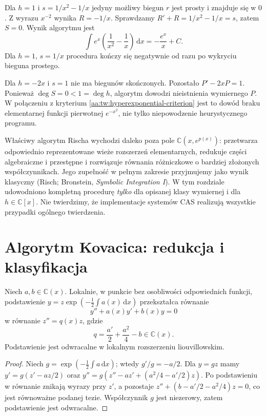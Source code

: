 \begin{przyklad}
\label{aa:prz:risch-e-success}
Dla $h=1$ i $s=1/x^2-1/x$
jedyny możliwy biegun $r$
jest prosty i znajduje się
w $0$. Z wyrazu $x^{-2}$
wynika $R=-1/x$.
Sprawdzamy
$R'+R=1/x^2-1/x=s$,
zatem $S=0$.
Wynik algorytmu jest
\[
 \int e^x\left(\frac1{x^2}-\frac1x\right)
 \,\mathrm dx=-\frac{e^x}{x}+C.
\]
Dla $h=1$, $s=1/x$
procedura kończy się negatywnie
od razu po wykryciu bieguna prostego.
\end{przyklad}

\begin{przyklad}
\label{aa:prz:risch-gauss-decision}
Dla $h=-2x$ i $s=1$
nie ma biegunów skończonych.
Pozostało $P'-2xP=1$.
Ponieważ $\deg S=0<1=\deg h$,
algorytm dowodzi nieistnienia
wymiernego $P$.
W połączeniu z kryterium
\ref{aa:tw:hyperexponential-criterion}
jest to dowód braku
elementarnej funkcji pierwotnej
$e^{-x^2}$, nie tylko niepowodzenie
heurystycznego programu.
\end{przyklad}

\begin{uwaga}
\label{aa:uw:full-risch-scope}
Właściwy algorytm Rischa
wychodzi daleko poza pole
$\mathbb C(x,e^{p(x)})$:
przetwarza odpowiednio
reprezentowane wieże
rozszerzeń elementarnych,
redukuje części algebraiczne
i przestępne i rozwiązuje
równania różniczkowe o bardziej
złożonych współczynnikach.
Jego zupełność w pełnym
zakresie przyjmujemy jako
wynik klasyczny (Risch;
Bronstein, \emph{Symbolic Integration I}).
W tym rozdziale udowodniono
kompletną procedurę \emph{tylko}
dla opisanej klasy wymiernej
i dla $h\in\mathbb C[x]$.
Nie twierdzimy, że
implementacje systemów CAS
realizują wszystkie przypadki
ogólnego twierdzenia.
\end{uwaga}

\section{Algorytm Kovacica: redukcja i klasyfikacja}

\begin{lemat}
\label{aa:lem:kovacic-normal-form}
Niech $a,b\in\mathbb C(x)$.
Lokalnie, w punkcie bez osobliwości
odpowiednich funkcji, podstawienie
$y=z\exp(-\tfrac12\int a(x)\,\mathrm dx)$
przekształca równanie
\[
 y''+a(x)y'+b(x)y=0
\]
w równanie $z''=q(x)z$, gdzie
\begin{equation}\label{aa:eq:kovacic-normal-q}
 q=\frac{a'}2+\frac{a^2}4-b
 \in\mathbb C(x).
\end{equation}
Podstawienie jest odwracalne
w lokalnym rozszerzeniu
liouvillowskim.
\end{lemat}
\begin{proof}
Niech $g=\exp(-\tfrac12\int a\,\mathrm dx)$;
wtedy $g'/g=-a/2$.
Dla $y=gz$ mamy
$y'=g(z'-az/2)$ oraz
$y''=g(z''-az'+(a^2/4-a'/2)z)$.
Po podstawieniu w równanie
znikają wyrazy przy $z'$,
a pozostaje
$z''+(b-a'/2-a^2/4)z=0$,
co jest równoważne podanej tezie.
Współczynnik $g$ jest niezerowy,
zatem podstawienie jest odwracalne.
\end{proof}

